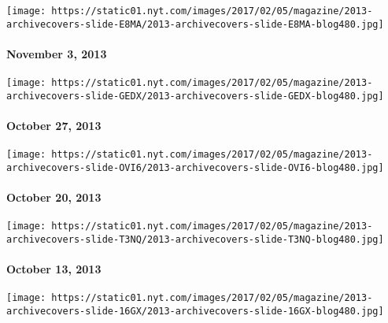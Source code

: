 \href{http://www.nytimes.com/indexes/2013/11/03/magazine/index.html}{}

\texttt{[image: https://static01.nyt.com/images/2017/02/05/magazine/2013-archivecovers-slide-E8MA/2013-archivecovers-slide-E8MA-blog480.jpg]}

\hypertarget{november-3-2013}{%
\paragraph{November 3, 2013}\label{november-3-2013}}

\href{http://www.nytimes.com/indexes/2013/10/27/magazine/index.html}{}

\texttt{[image: https://static01.nyt.com/images/2017/02/05/magazine/2013-archivecovers-slide-GEDX/2013-archivecovers-slide-GEDX-blog480.jpg]}

\hypertarget{october-27-2013}{%
\paragraph{October 27, 2013}\label{october-27-2013}}

\href{http://www.nytimes.com/indexes/2013/10/20/magazine/index.html}{}

\texttt{[image: https://static01.nyt.com/images/2017/02/05/magazine/2013-archivecovers-slide-OVI6/2013-archivecovers-slide-OVI6-blog480.jpg]}

\hypertarget{october-20-2013}{%
\paragraph{October 20, 2013}\label{october-20-2013}}

\href{http://www.nytimes.com/indexes/2013/10/13/magazine/index.html}{}

\texttt{[image: https://static01.nyt.com/images/2017/02/05/magazine/2013-archivecovers-slide-T3NQ/2013-archivecovers-slide-T3NQ-blog480.jpg]}

\hypertarget{october-13-2013}{%
\paragraph{October 13, 2013}\label{october-13-2013}}

\href{http://www.nytimes.com/indexes/2013/10/06/magazine/index.html}{}

\texttt{[image: https://static01.nyt.com/images/2017/02/05/magazine/2013-archivecovers-slide-16GX/2013-archivecovers-slide-16GX-blog480.jpg]}

